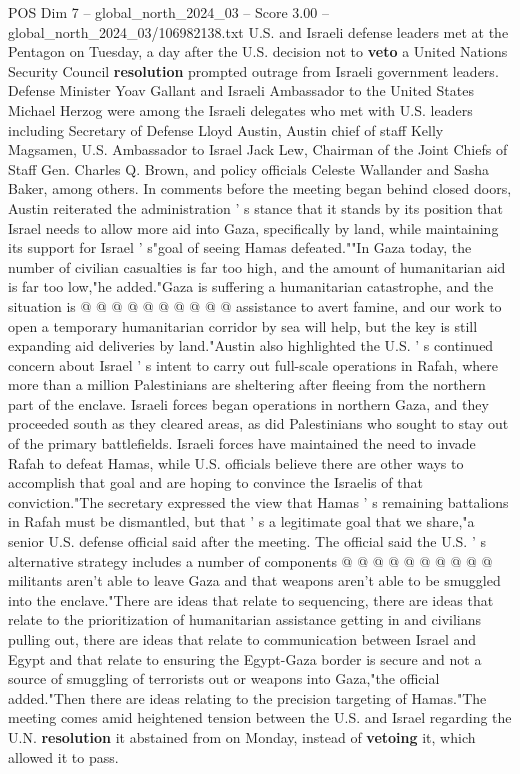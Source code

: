 \begin{textsample}{POS Dim 7 – global\_north\_2024\_03 – Score 3.00 – global\_north\_2024\_03/106982138.txt}  \label{ex:f7_pos_217}
U.S. and Israeli defense leaders met at the Pentagon on Tuesday, a day after the U.S. decision not to \textbf{veto} a United Nations Security Council \textbf{resolution} prompted outrage from Israeli government leaders.
Defense Minister Yoav Gallant and Israeli Ambassador to the United States Michael Herzog were among the Israeli delegates who met with U.S. leaders including Secretary of Defense Lloyd Austin, Austin chief of staff Kelly Magsamen, U.S.
Ambassador to Israel Jack Lew, Chairman of the Joint Chiefs of Staff Gen.
Charles Q.
Brown, and policy officials Celeste Wallander and Sasha Baker, among others.
In comments before the meeting began behind closed doors, Austin reiterated the administration ' s stance that it stands by its position that Israel needs to allow more aid into Gaza, specifically by land, while maintaining its support for Israel ' s"goal of seeing Hamas defeated.""In Gaza today, the number of civilian casualties is far too high, and the amount of humanitarian aid is far too low,"he added."Gaza is suffering a humanitarian catastrophe, and the situation is @ @ @ @ @ @ @ @ @ @ assistance to avert famine, and our work to open a temporary humanitarian corridor by sea will help, but the key is still expanding aid deliveries by land."Austin also highlighted the U.S. ' s continued concern about Israel ' s intent to carry out full-scale operations in Rafah, where more than a million Palestinians are sheltering after fleeing from the northern part of the enclave.
Israeli forces began operations in northern Gaza, and they proceeded south as they cleared areas, as did Palestinians who sought to stay out of the primary battlefields.
Israeli forces have maintained the need to invade Rafah to defeat Hamas, while U.S. officials believe there are other ways to accomplish that goal and are hoping to convince the Israelis of that conviction."The secretary expressed the view that Hamas ' s remaining battalions in Rafah must be dismantled, but that ' s a legitimate goal that we share,"a senior U.S. defense official said after the meeting.
The official said the U.S. ' s alternative strategy includes a number of components @ @ @ @ @ @ @ @ @ @ militants aren't able to leave Gaza and that weapons aren't able to be smuggled into the enclave."There are ideas that relate to sequencing, there are ideas that relate to the prioritization of humanitarian assistance getting in and civilians pulling out, there are ideas that relate to communication between Israel and Egypt and that relate to ensuring the Egypt-Gaza border is secure and not a source of smuggling of terrorists out or weapons into Gaza,"the official added."Then there are ideas relating to the precision targeting of Hamas."The meeting comes amid heightened tension between the U.S. and Israel regarding the U.N. \textbf{resolution} it abstained from on Monday, instead of \textbf{vetoing} it, which allowed it to pass.

\end{textsample}
